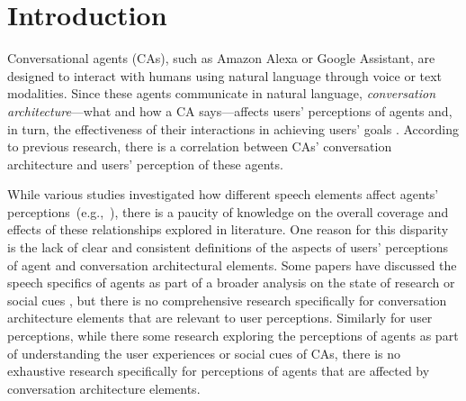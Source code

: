 
\section{Introduction}

Conversational agents (CAs), such as Amazon Alexa or Google Assistant, are designed to interact with humans using natural language through voice or text modalities. Since these agents communicate in natural language, \textit{conversation architecture}---what and how a CA says---affects users' perceptions of agents and, in turn, the effectiveness of their interactions in achieving users' goals \cite{knijnenburg2016inferring, seeger2021chatbots}. According to previous research, there is a correlation between CAs' conversation architecture and users' perception of these agents.

While various studies investigated how different speech elements affect agents' perceptions~(e.g.,~\cite{clark2019state, feine2019taxonomy, finch2020towards}), there is a paucity of knowledge on the overall coverage and effects of these relationships explored in literature. One reason for this disparity is the lack of clear and consistent definitions of the aspects of users' perceptions of agent and conversation architectural elements. Some papers have discussed the speech specifics of agents as part of  a broader analysis on the state of research \cite{clark2019state} or social cues \cite{feine2019taxonomy}, but there is no comprehensive research specifically for conversation architecture elements that are relevant to user perceptions. Similarly for user perceptions, while there some research exploring the perceptions of agents as part of understanding the user experiences \cite{clark2019state, finch2020towards} or social cues \cite{feine2019taxonomy} of CAs, there is no exhaustive research specifically for perceptions of agents that are affected by conversation architecture elements. 


